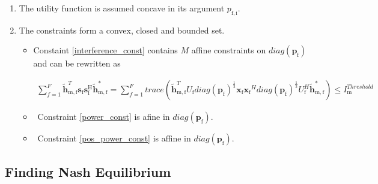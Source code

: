 \documentclass[12pt,a4paper]{report}
\begin{document}
\begin{enumerate}
\item The utility function is assumed concave in its argument $p_{\mathrm{f,i}}$.

\item
The constraints form a convex, closed and bounded set. 

\begin{itemize}

\item
	Constaint \eqref{interference_const} contains $M$ affine constraints on $diag(\mathbf{p_{\mathrm{f}}})$ and 
	can be rewritten as 

\begin{gather*}
	  \sum^F_{f=1} \mathbf{\tilde{h}}_{\mathrm{m,f}}^T  \mathbf{s}_{\mathrm{f}} 						
	\mathbf{s_{\mathrm{f}}^{\mathrm{H}}} \mathbf{\tilde{h}_{\mathrm{m,f}}^*} = 
	\sum^F_{f=1} trace(\mathbf{\tilde{h}}_{\mathrm{m,f}}^T U_{\mathrm{f}}diag(\mathbf{p_{\mathrm{f}}})^{\frac{1}{2}}\mathbf{x_{\mathrm{f}}}
	 \mathbf{x_{\mathrm{f}}}^H  diag(\mathbf{p_{\mathrm{f}}})^{\frac{1}{2}} U_{\mathrm{f}}^H
	 \mathbf{\tilde{h}}_{\mathrm{m,f}}^*
	)	
	\leq I^{Threshold}_{\mathrm{m}} 
\end{gather*}

\item \
	Constraint \eqref{power_const} is  afine in $diag(\mathbf{p_{\mathrm{f}}})$.
	
\item \
	Constraint \eqref{pos_power_const} is affine in $diag(\mathbf{p_{\mathrm{f}}})$.
\end{itemize}


\end{enumerate}



\subsection{Finding Nash Equilibrium}
\end{document}
